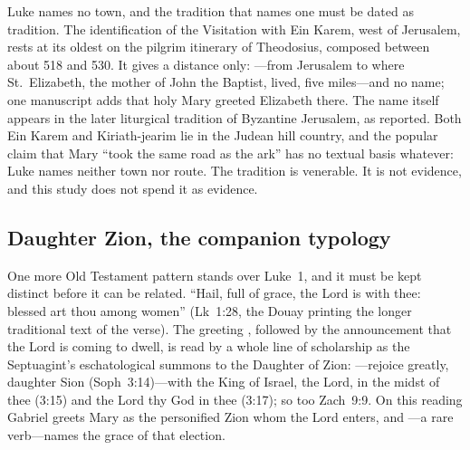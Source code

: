 Luke names no town, and the tradition that names one must be dated as
tradition. The identification of the Visitation with Ein Karem, west of
Jerusalem, rests at its oldest on the pilgrim itinerary of Theodosius,
composed between about 518 and 530. It gives a distance only:
---from Jerusalem to where St.~Elizabeth, the
mother of John the Baptist, lived, five miles---and no name; one
manuscript adds that holy Mary greeted Elizabeth there. The name itself
appears in the later liturgical tradition of Byzantine Jerusalem, as
reported. Both Ein Karem and
Kiriath-jearim lie in the Judean hill country, and the popular claim that
Mary ``took the same road as the ark'' has no textual basis whatever: Luke
names neither town nor route. The tradition is venerable. It is not
evidence, and this study does not spend it as evidence.

\subsection{Daughter Zion, the companion typology}

One more Old Testament pattern stands over Luke~1, and it must be kept
distinct before it can be related. ``Hail, full of grace, the Lord is with
thee: blessed art thou among women'' (Lk~1:28, the Douay printing the
longer traditional text of the verse). The greeting ,
followed by the announcement that the Lord is coming to dwell, is read by
a whole line of scholarship as the Septuagint's eschatological summons to
the Daughter of Zion: ---rejoice
greatly, daughter Sion (Soph~3:14)---with the King of Israel, the Lord, in
the midst of thee (3:15) and the Lord thy God in thee (3:17); so too
Zach~9:9. On this reading Gabriel greets Mary as the personified Zion
whom the Lord enters, and ---a rare verb---names the
grace of that election.

